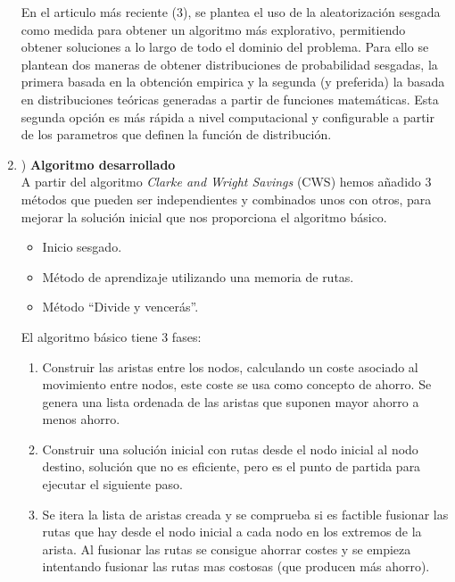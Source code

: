 \documentclass[11pt]{article} %
\begin{document}
\begin{enumerate}
En el articulo más reciente (3), se plantea el uso de la aleatorización sesgada como medida para obtener un algoritmo más explorativo, permitiendo obtener soluciones a lo largo de todo el dominio del problema. Para ello se plantean dos maneras de obtener distribuciones de probabilidad sesgadas, la primera basada en la obtención empirica y la segunda (y preferida) la basada en distribuciones teóricas generadas a partir de funciones matemáticas. Esta segunda opción es más rápida a nivel computacional y configurable a partir de los parametros que definen la función de distribución.

\clearpage

   \item) \textbf{Algoritmo desarrollado}\\[0.2cm]
A partir del algoritmo \textit{Clarke and Wright Savings} (CWS) hemos añadido 3 métodos que pueden ser independientes y combinados unos con otros, para mejorar la solución inicial que nos proporciona el algoritmo básico.
\begin{itemize}
\item Inicio sesgado.
\item Método de aprendizaje utilizando una memoria de rutas.
\item Método “Divide y vencerás”.
\end{itemize}
El algoritmo básico tiene 3 fases:
\renewcommand{\labelenumii}{\arabic{enumii}}
\begin{enumerate}
\item Construir las aristas entre los nodos, calculando un coste asociado al movimiento entre nodos, este coste se usa como concepto de ahorro. Se genera una lista ordenada de las aristas que suponen mayor ahorro a menos ahorro.
\item Construir una solución inicial con rutas desde el nodo inicial al nodo destino, solución que no es eficiente, pero es el punto de partida para ejecutar el siguiente paso.
\item Se itera la lista de aristas creada y se comprueba si es factible fusionar las rutas que hay desde el nodo inicial a cada nodo en los extremos de la arista. Al fusionar las rutas se consigue ahorrar costes y se empieza intentando fusionar las rutas mas costosas (que producen más ahorro).
\end{enumerate}


\end{enumerate}
\end{document}
